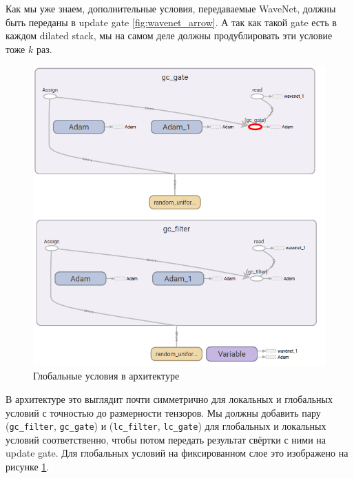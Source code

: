 \documentclass[../diploma.tex]{subfiles}
\begin{document}
Как мы уже знаем, дополнительные условия, передаваемые WaveNet, должны быть переданы в update gate \ref{fig:wavenet_arrow}. А так как такой gate есть в каждом dilated stack, мы на самом деле должны продублировать эти условие тоже $k$ раз.




\begin{figure}[!htbp]
  \centering
  \includegraphics[scale=1]{img/gc}
  \caption{Глобальные условия в архитектуре}
  \label{fig:gc}
\end{figure}


В архитектуре это выглядит почти симметрично для локальных и глобальных условий с точностью до размерности тензоров. Мы должны добавить пару (\verb|gc_filter|, \verb|gc_gate|) и (\verb|lc_filter|, \verb|lc_gate|) для глобальных и локальных условий соответственно, чтобы потом передать результат свёртки с ними на update gate. Для глобальных условий на фиксированном слое это изображено на рисунке \ref{fig:gc}.
\end{document}
